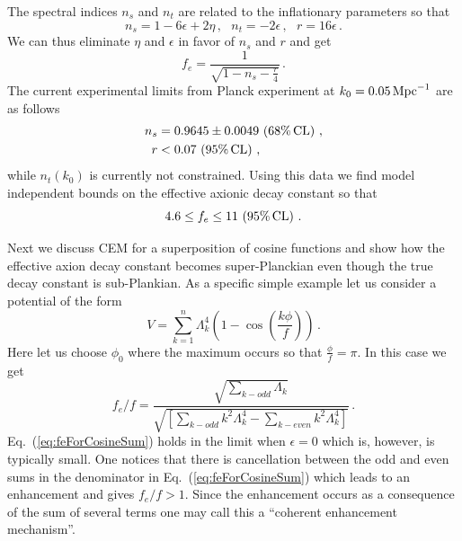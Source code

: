 \documentclass[12pt]{article}
\begin{document}
The spectral indices $n_s$ and $n_t$ are related to the inflationary parameters so that
\begin{equation} \label{eq:observablesSlowRoll}
  n_s = 1 - 6 \epsilon + 2 \eta\,,
  ~~~ n_t = -2 \epsilon\,,
  ~~~ r = 16 \epsilon\,.
\end{equation}
We can thus eliminate $\eta$ and $\epsilon$ in favor of $n_s$ and $r$ and get
\begin{equation}
  f_e = \frac{1}{\sqrt{1 - n_s - \frac{r}{4}}}\,.
\end{equation}
The current experimental limits from Planck experiment at $k_0 = 0.05\,{\rm Mpc}^{-1}$ are as follows~\cite{Adam:2015rua, Ade:2015lrj, Array:2015xqh}
\begin{equation} \label{data}
  \begin{aligned}
    n_s &= 0.9645 \pm 0.0049\, \left(68\%\, {\rm CL}\right)\,,\\
      r &< 0.07\, \left(95\%\, {\rm CL}\right)\,,
  \end{aligned}
\end{equation}
while $n_t\left(k_0\right)$ is currently not constrained.
Using this data we find model independent bounds on the effective axionic decay constant so that
\begin{equation}
  4.6 \leq f_e \leq 11\, \left(95\%\, {\rm CL}\right)\,.
\end{equation}

Next we discuss CEM for a superposition of cosine functions and show how the effective axion decay constant becomes super-Planckian even though the true decay constant is sub-Plankian.
As a specific simple example let us consider a potential of the form
\begin{equation} \label{eq:cosineSumPotential}
  V = \sum_{k = 1}^n \Lambda_k^4 \left(1 - \cos\left(\frac{k\phi}{f}\right)\right)\,.
\end{equation}
Here let us choose $\phi_0$ where the maximum occurs so that $\frac{\phi}{f} = \pi$.
In this case we get
\begin{equation} \label{eq:feForCosineSum}
  {f_e} / f = \frac
    {\sqrt{\sum_{k - odd} \Lambda_k}}
    {\sqrt{\left[\sum_{k - odd} k^2 \Lambda_k^4 - \sum_{k - even} k^2 \Lambda_k^4\right]}}\,.
\end{equation}
Eq.~(\ref{eq:feForCosineSum}) holds in the limit when $\epsilon = 0$ which is, however, is typically small.
One notices that there is cancellation between the odd and even sums in the denominator in Eq.~(\ref{eq:feForCosineSum}) which leads to an enhancement and gives $f_e / f > 1$.
Since the enhancement occurs as a consequence of the sum of several terms one may call this a ``coherent enhancement mechanism''.
\end{document}
